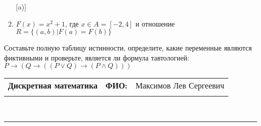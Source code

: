 \documentclass[10pt]{exam}
\newcommand{\class}{Дискретная математика}
\newcommand{\examdate}{}
\begin{document}
\begin{questions}
\begin{enumerate} [a)]
\item $F(x)=x^{2}+1$, где $x \in A = [-2, 4]$ и отношение $R = \{(a,b)|F(a) = F(b)\}$
\end{enumerate}\question Составьте полную таблицу истинности, определите, какие переменные являются фиктивными и проверьте, является ли формула тавтологией:
$ P \rightarrow (Q \rightarrow ((P \lor Q) \rightarrow (P \land Q)))$

\end{questions}
\newpage
\begin{flushright}
\begin{tabular}{p{2.8in} r l}
\textbf{\class} & \textbf{ФИО:} &Максимов Лев Сергеевич
\\

\textbf{\examdate} &&\\
\end{tabular}\\
\end{flushright}
\rule[1ex]{\textwidth}{.1pt}
\end{document}
